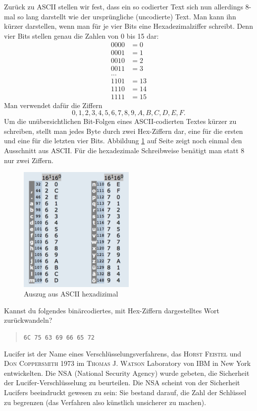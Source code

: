 \documentclass[%
11pt,%
twoside,%
titlepage,%
german,%
headsepline%
]{scrartcl}
\begin{document}
Zurück zu ASCII stellen wir fest, dass ein so codierter Text sich nun allerdings 8-mal so lang darstellt wie der ursprüngliche (uncodierte) Text. Man kann ihn kürzer darstellen, wenn man für je vier Bits eine Hexadezimalziffer schreibt. Denn vier Bits stellen genau die Zahlen von 0 bis 15 dar:
\begin{align*}
0000 &= 0\\
0001 &= 1\\
0010 &= 2\\
0011 &= 3\\
\dots\\
1101 &= 13\\
1110 &= 14\\
1111 &= 15
\end{align*}
Man verwendet dafür die Ziffern
$$0,1,2,3,4,5,6,7,8,9,A,B,C,D,E,F.$$
Um die unübersichtlichen Bit-Folgen eines ASCII-codierten Textes kürzer zu schreiben, stellt man jedes Byte durch zwei Hex-Ziffern dar, eine für die ersten und eine für die letzten vier Bits.
Abbildung \ref{abb:ascii} auf Seite \pageref{abb:ascii} zeigt noch einmal den Ausschnitt aus ASCII. Für die hexadezimale Schreibweise benätigt man statt 8 nur zwei Ziffern.
\begin{figure}
\begin{center}
\includegraphics[width=0.5\textwidth]{pictures/asciihex}
\end{center}
\caption{Auszug aus ASCII hexadizimal}\label{abb:ascii}
\end{figure}
\begin{ueb}
Kannst du folgendes binärcodiertes, mit Hex-Ziffern dargestelltes Wort zurückwandeln? 
\begin{quote}
\texttt{6C 75 63 69 66 65 72}
\end{quote}
\end{ueb}
Lucifer ist der Name eines Ver\-schlüs\-se\-lungs\-ver\-fahrens, das \textsc{Horst Feistel} und \textsc{Don Coppersmith} 1973 im \textsc{Thomas J. Watson} Laboratory von IBM in New York entwickelten. Die NSA (National Security Agency) wurde gebeten, die Sicherheit der Lucifer-Verschlüsselung zu beurteilen. Die NSA scheint von der Sicherheit Lucifers beeindruckt gewesen zu sein: Sie bestand darauf, die Zahl der Schlüssel zu begrenzen (das Verfahren also künstlich unsicherer zu machen).
\end{document}
